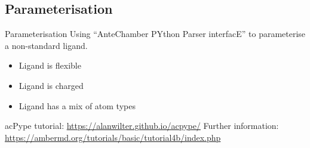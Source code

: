 \subsection{Parameterisation}
\begin{frame}{Parameterisation}
Using \enquote{AnteChamber PYthon Parser interfacE} to parameterise a non-standard ligand.
\vspace{1cm}
\begin{itemize}
	\item Ligand is flexible
 	\item Ligand is charged
	\item Ligand has a mix of atom types
\end{itemize}
\vspace{1cm}
acPype tutorial: \href{https://alanwilter.github.io/acpype/}{https://alanwilter.github.io/acpype/}
\newline
Further information: \href{https://ambermd.org/tutorials/basic/tutorial4b/index.php}{https://ambermd.org/tutorials/basic/tutorial4b/index.php}
\end{frame}